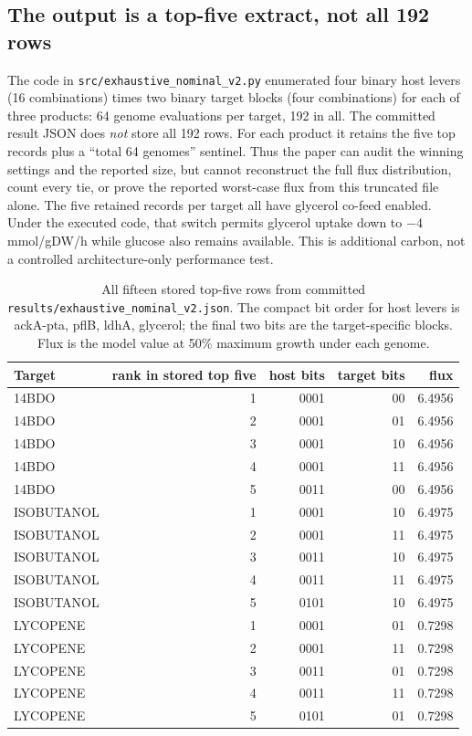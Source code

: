 \subsection{The output is a top-five extract, not all 192 rows}
The code in \texttt{src/exhaustive\_nominal\_v2.py} enumerated four binary host levers (16 combinations) times two binary target blocks (four combinations) for each of three products: 64 genome evaluations per target, 192 in all. The committed result JSON does \emph{not} store all 192 rows. For each product it retains the five top records plus a ``total 64 genomes'' sentinel. Thus the paper can audit the winning settings and the reported size, but cannot reconstruct the full flux distribution, count every tie, or prove the reported worst-case flux from this truncated file alone. The five retained records per target all have glycerol co-feed enabled. Under the executed code, that switch permits glycerol uptake down to $-4$ mmol/gDW/h while glucose also remains available. This is additional carbon, not a controlled architecture-only performance test.
\begin{table}[!htbp]\centering\small\caption{All fifteen stored top-five rows from committed \texttt{results/exhaustive\_nominal\_v2.json}. The compact bit order for host levers is ackA-pta, pflB, ldhA, glycerol; the final two bits are the target-specific blocks. Flux is the model value at 50\% maximum growth under each genome.}\begin{tabular}{lrrrr}\hline Target & rank in stored top five & host bits & target bits & flux \\\hline
14BDO & 1 & 0001 & 00 & 6.4956 \\
14BDO & 2 & 0001 & 01 & 6.4956 \\
14BDO & 3 & 0001 & 10 & 6.4956 \\
14BDO & 4 & 0001 & 11 & 6.4956 \\
14BDO & 5 & 0011 & 00 & 6.4956 \\
ISOBUTANOL & 1 & 0001 & 10 & 6.4975 \\
ISOBUTANOL & 2 & 0001 & 11 & 6.4975 \\
ISOBUTANOL & 3 & 0011 & 10 & 6.4975 \\
ISOBUTANOL & 4 & 0011 & 11 & 6.4975 \\
ISOBUTANOL & 5 & 0101 & 10 & 6.4975 \\
LYCOPENE & 1 & 0001 & 01 & 0.7298 \\
LYCOPENE & 2 & 0001 & 11 & 0.7298 \\
LYCOPENE & 3 & 0011 & 01 & 0.7298 \\
LYCOPENE & 4 & 0011 & 11 & 0.7298 \\
LYCOPENE & 5 & 0101 & 01 & 0.7298 \\
\hline\end{tabular}\end{table}
